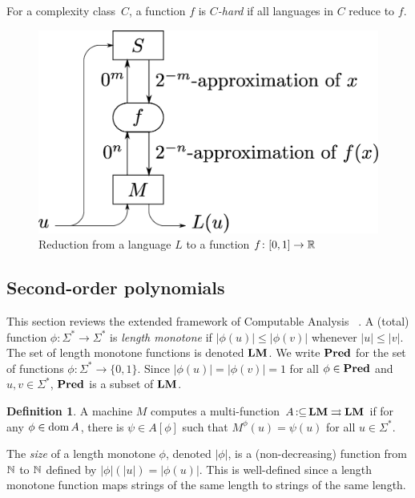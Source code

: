 \documentclass{article}
\theoremstyle{definition}
\newtheorem{definition}[theorem]{Definition}
\theoremstyle{remark}
\newcommand{\pcolon}{\mathpunct{\,:\subseteq}}
\begin{document}
For a complexity class~$C$, a function $f$ is \emph{$C$-hard}
if all languages in $C$ reduce to $f$.

 \begin{figure}
  \begin{center}
  \includegraphics[scale=0.25]{image/reduction.eps}
  \caption{Reduction from a language $L$ to a function $f \colon [0,1] \to \mathbb R$}
  \label{fig:reduction}
  \end{center}
 \end{figure}

\subsection{Second-order polynomials}
\label{section:TTF}

This section reviews the extended framework of Computable Analysis~%
\cite{kawamura2012complexity}.
A (total) function $\phi \colon \Sigma^* \to \Sigma^*$ is \emph{length monotone}
if  $|\phi(u)| \le |\phi(v)|$ whenever $|u| \le |v|$.
The set of length monotone functions is denoted $\mathbf{LM}$.
We write $\mathbf{Pred}$ for the set of functions $\phi \colon \Sigma^* \to \{0, 1\}$.
Since $|\phi(u)| = |\phi(v)| = 1$ for all $\phi \in \mathbf{Pred}$ and $u, v \in \Sigma^*$,
$\mathbf{Pred}$ is a subset of $\mathbf{LM}$.

\begin{definition}
 A machine $M$ computes a multi-function $A \pcolon \LM \rightrightarrows \LM$ if for any
 $\phi \in \mathop{\rm dom} A$, there is $\psi \in A[\phi]$ such that $M^\phi(u) = \psi(u)$ for all $u \in \Sigma^*$.
\end{definition}

The \emph{size} of a length monotone $\phi$, denoted $|\phi|$,
is a (non-decreasing) function from $\mathbb N$ to $\mathbb N$ defined by 
$|\phi|(|u|) = |\phi(u)|$.
This is well-defined since a length monotone function maps 
strings of the same length to strings of the same length.
\end{document}
